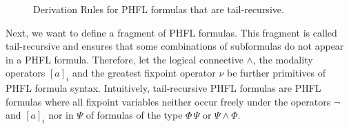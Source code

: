 \begin{figure}
    \caption{Derivation Rules for PHFL formulas that are tail-recursive.}
    \label{figure:phfl-tail-recursive}
\end{figure}

Next, we want to define a fragment of PHFL formulas. This fragment is called tail-recursive and ensures that
some combinations of subformulas do not appear in a PHFL formula. Therefore, let the logical connective
$\wedge$, the modality operators $[a]_i$ and the greatest fixpoint operator $\nu$ be further primitives of PHFL formula
syntax. Intuitively, tail-recursive PHFL formulas are PHFL formulas where all fixpoint variables neither occur freely
under the operators $\neg$ and $[a]_i$ nor in $\Psi$ of formulas of the type $\Phi\,\Psi$ or $\Psi \wedge \Phi$.

